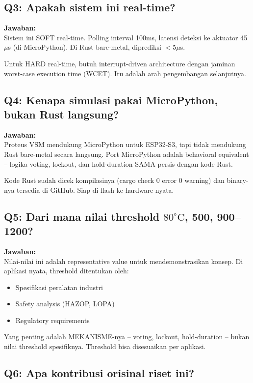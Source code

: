 \documentclass[12pt,a4paper]{article}
\begin{document}
\subsection{Q3: Apakah sistem ini real-time?}

\textbf{Jawaban:}\\
Sistem ini SOFT real-time. Polling interval 100ms, latensi deteksi ke aktuator
45$\mu$s (di MicroPython). Di Rust bare-metal, diprediksi $< 5\mu$s.

Untuk HARD real-time, butuh interrupt-driven architecture dengan jaminan
worst-case execution time (WCET). Itu adalah arah pengembangan selanjutnya.

\subsection{Q4: Kenapa simulasi pakai MicroPython, bukan Rust langsung?}

\textbf{Jawaban:}\\
Proteus VSM mendukung MicroPython untuk ESP32-S3, tapi tidak mendukung
Rust bare-metal secara langsung. Port MicroPython adalah behavioral equivalent
-- logika voting, lockout, dan hold-duration SAMA persis dengan kode Rust.

Kode Rust sudah dicek kompilasinya (cargo check 0 error 0 warning) dan
binary-nya tersedia di GitHub. Siap di-flash ke hardware nyata.

\subsection{Q5: Dari mana nilai threshold $80^{\circ}\mathrm{C}$, 500, 900--1200?}

\textbf{Jawaban:}\\
Nilai-nilai ini adalah representative value untuk mendemonstrasikan konsep.
Di aplikasi nyata, threshold ditentukan oleh:
\begin{itemize}[nosep]
    \item Spesifikasi peralatan industri
    \item Safety analysis (HAZOP, LOPA)
    \item Regulatory requirements
\end{itemize}

Yang penting adalah MEKANISME-nya -- voting, lockout, hold-duration -- bukan
nilai threshold spesifiknya. Threshold bisa disesuaikan per aplikasi.

\subsection{Q6: Apa kontribusi orisinal riset ini?}
\end{document}
